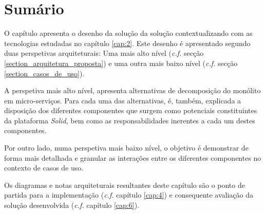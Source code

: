 \section{Sumário}
O capítulo apresenta o desenho da solução da solução contextualizando com as tecnologias estudadas no capítulo \ref{cap:2}.
Este desenho é apresentado segundo duas perspetivas arquiteturais: Uma mais alto nível (\emph{c.f.} secção \ref{section_arquitetura_proposta}) e uma outra mais baixo nível (\emph{c.f.} secção \ref{section_casos_de_uso}).

A perspetiva mais alto nível, apresenta alternativas de decomposição do monólito em micro-serviços. Para cada uma das alternativas, é, também, explicada a disposição dos diferentes componentes que surgem como potenciais constituintes da plataforma \emph{Solid}, bem como as responsabilidades inerentes a cada um destes componentes.

Por outro lado, numa perspetiva mais baixo nível, o objetivo é demonstrar de forma mais detalhada e granular as interações entre os diferentes componentes no contexto de casos de uso.

Os diagramas e notas arquiteturais resultantes deste capítulo são o ponto de partida para a implementação (\emph{c.f.} capítulo \ref{cap:4}) e consequente avaliação da solução desenvolvida (\emph{c.f.} capítulo \ref{cap:6}).












